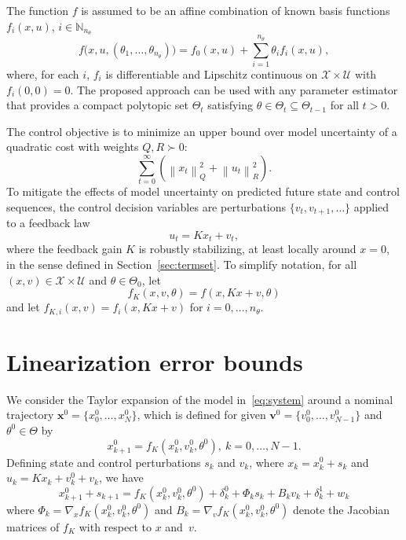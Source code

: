 \documentclass{IEEEtran}
\theoremstyle{definition}
\theoremstyle{remark}
\begin{document}
The function $f$ is assumed to be an affine combination of known basis functions $f_i(x,u)$, $i \in\mathbb{N}_{n_{\theta}}$
\begin{equation}\label{eq:theta_expansion}
f\bigl(x,u,(\theta_1,\ldots,\theta_{n_\theta})\bigr) = f_0(x,u) + \sum_{i=1}^{n_{\theta}} {\theta_i f_i(x,u)} ,
\end{equation}
where,  for each $i$, $f_i$ is differentiable and Lipschitz continuous on $\mathcal{X}\times\mathcal{U}$ with $f_i(0,0) = 0$.
The proposed approach can be used with any parameter estimator that provides a compact polytopic set $\Theta_t$ satisfying $\theta \in \Theta_t \subseteq \Theta_{t-1}$ for all $t>0$.

The control objective is to minimize an upper bound over model uncertainty of a quadratic cost with weights $Q,R\succ0$:
\begin{equation} \label{eq:cost}
\sum_{t=0}^{\infty} (\left\lVert x_t \right\rVert^2_Q +  \left\lVert u_t \right\rVert^2_R).
\end{equation}
To mitigate the effects of model uncertainty on predicted future state and control sequences, the control decision variables are perturbations $\{v_t, v_{t+1} ,\ldots\}$ applied to a feedback law
\[
u_t = K x_t + v_t ,
\]
where the feedback gain $K$ is robustly stabilizing, at least locally around $x=0$, in the sense defined in Section~\ref{sec:termset}.
To simplify notation, for all $(x,v)\in\mathcal{X}\times\mathcal{U}$ and $\theta\in\Theta_0$, let
\[
f_{K}(x,v,\theta) = f(x,Kx+v,\theta)
\]
and let $f_{K,i}(x,v) = f_i(x,Kx+v)$ for $i=0,\ldots,n_{\theta}$.

\section{Linearization error bounds}\label{sec:error_bounds}
We consider the Taylor expansion of the model in~\eqref{eq:system} around a nominal trajectory $\mathbf{x}^0 = \{x^0_0,\ldots, x^0_{N}\}$, which is defined for given
$\mathbf{v}^0 = \{v^0_0, \ldots, v^0_{N-1}\}$ 
and $\theta^0\in\Theta$ 
by
\begin{equation}\label{eq:nominal_system}
x^0_{k+1} = f_K(x_k^0, v^0_k, \theta^0), \ k = 0,\ldots, N-1.
\end{equation}
Defining state and control perturbations $s_k$ and $v_k$, where $x_k = x_k^0 + s_k$ and $u_k = Kx_k + v^0_k + v_k$, we have
\begin{equation}\label{eq:taylor}
x^0_{k+1}+s_{k+1} =  f_K(x^0_k,v^0_k,\theta^0) + \delta^0_k + \Phi_k s_k + B_k v_k + \delta^1_k + w_k
\end{equation}
where $\Phi_k = \nabla_x f_K (x^0_k,v^0_k,\theta^0)$ and $B_k = \nabla_v f_K (x^0_k,v^0_k,\theta^0)$ denote the Jacobian matrices of $f_K$ with respect to $x$ and~$v$.
\end{document}
